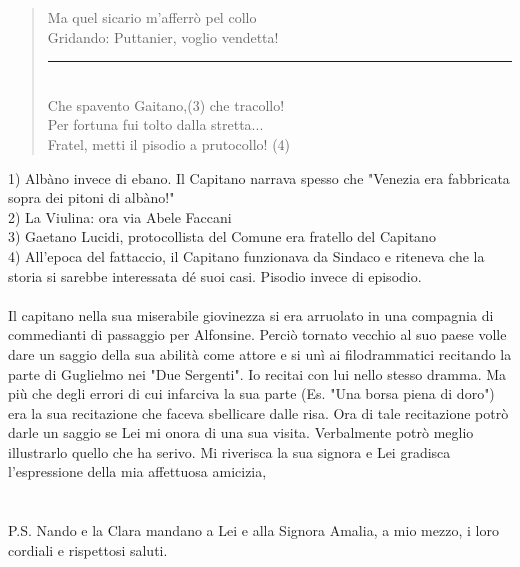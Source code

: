 \documentclass[10pt]{memoir} %
\begin{document}
{\begin{verse}
	Ma quel sicario m'afferrò pel collo\\
	Gridando: Puttanier, voglio vendetta!\\
	\rule{1.5cm}{0.4pt}\\
	Che spavento Gaitano,(3) che tracollo!\\
	Per fortuna fui tolto dalla stretta...\\
	Fratel, metti il pisodio a prutocollo! (4)\\
\end{verse}
1) Albàno invece di ebano. Il Capitano narrava spesso che "Venezia era fabbricata sopra dei pitoni di albàno!"\\
2) La Viulina: ora via Abele Faccani\\
3) Gaetano Lucidi, protocollista del Comune era fratello del Capitano\\
4) All'epoca del fattaccio, il Capitano funzionava da Sindaco e riteneva che la storia si sarebbe interessata dé suoi casi. Pisodio invece di episodio. \\
\\
Il capitano nella sua miserabile giovinezza si era arruolato in una compagnia di commedianti di passaggio per Alfonsine. Perciò tornato vecchio al suo paese volle dare un saggio della sua abilità come attore e si unì ai filodrammatici recitando la parte di Guglielmo nei "Due Sergenti". Io recitai con lui nello stesso dramma. Ma più che degli errori di cui infarciva la sua parte (Es. "Una borsa piena di doro") era la sua recitazione che faceva sbellicare dalle risa. Ora di tale recitazione potrò darle un saggio se Lei mi onora di una sua visita. Verbalmente potrò meglio illustrarlo quello che ha serivo. Mi riverisca la sua signora e Lei gradisca l'espressione della mia affettuosa amicizia,\\
\\\\P.S. Nando e la Clara mandano a Lei e alla Signora Amalia, a mio mezzo, i loro cordiali e rispettosi saluti.
}\\
\end{document}
